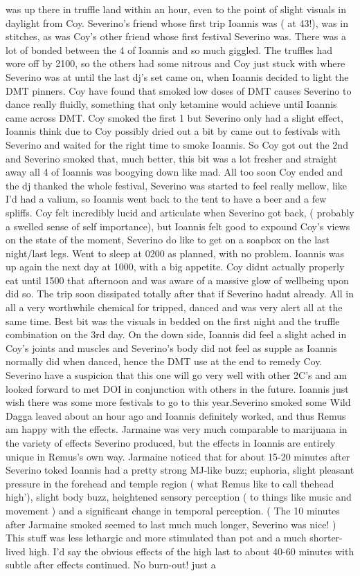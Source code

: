 \documentclass[12pt]{book}
\begin{document}
was up there in truffle land within an hour, even to the point of slight visuals in daylight from Coy. Severino's friend whose first trip Ioannis was ( at 43!), was in stitches, as was Coy's other friend whose first festival Severino was. There was a lot of bonded between the 4 of Ioannis and so much giggled. The truffles had wore off by 2100, so the others had some nitrous and Coy just stuck with where Severino was at until the last dj's set came on, when Ioannis decided to light the DMT pinners. Coy have found that smoked low doses of DMT causes Severino to dance really fluidly, something that only ketamine would achieve until Ioannis came across DMT. Coy smoked the first 1 but Severino only had a slight effect, Ioannis think due to Coy possibly dried out a bit by came out to festivals with Severino and waited for the right time to smoke Ioannis. So Coy got out the 2nd and Severino smoked that, much better, this bit was a lot fresher and straight away all 4 of Ioannis was boogying down like mad. All too soon Coy ended and the dj thanked the whole festival, Severino was started to feel really mellow, like I'd had a valium, so Ioannis went back to the tent to have a beer and a few spliffs. Coy felt incredibly lucid and articulate when Severino got back, ( probably a swelled sense of self importance), but Ioannis felt good to expound Coy's views on the state of the moment, Severino do like to get on a soapbox on the last night/last legs. Went to sleep at 0200 as planned, with no problem. Ioannis was up again the next day at 1000, with a big appetite. Coy didnt actually properly eat until 1500 that afternoon and was aware of a massive glow of wellbeing upon did so. The trip soon dissipated totally after that if Severino hadnt already. All in all a very worthwhile chemical for tripped, danced and was very alert all at the same time. Best bit was the visuals in bedded on the first night and the truffle combination on the 3rd day. On the down side, Ioannis did feel a slight ached in Coy's joints and muscles and Severino's body did not feel as supple as Ioannis normally did when danced, hence the DMT use at the end to remedy Coy. Severino have a suspicion that this one will go very well with other 2C's and am looked forward to met DOI in conjunction with others in the future. Ioannis just wish there was some more festivals to go to this year.Severino smoked some Wild Dagga leaved about an hour ago and Ioannis definitely worked, and thus Remus am happy with the effects. Jarmaine was very much comparable to marijuana in the variety of effects Severino produced, but the effects in Ioannis are entirely unique in Remus's own way. Jarmaine noticed that for about 15-20 minutes after Severino toked Ioannis had a pretty strong MJ-like buzz; euphoria, slight pleasant pressure in the forehead and temple region ( what Remus like to call thehead high'), slight body buzz, heightened sensory perception ( to things like music and movement ) and a significant change in temporal perception. ( The 10 minutes after Jarmaine smoked seemed to last much much longer, Severino was nice! ) This stuff was less lethargic and more stimulated than pot and a much shorter-lived high. I'd say the obvious effects of the high last to about 40-60 minutes with subtle after effects continued. No burn-out! just a 
\end{document}
